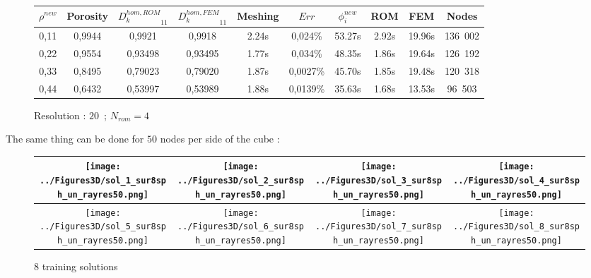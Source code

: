 {\begin{figure}[H]%
%
\begin{center}
\begin{tabular}{|c|c||c|c||c|c||c|c||c||c|}
\hline
\rowcolor{lightgray} $\rho^{new}$&Porosity&${D_k^{hom,ROM}}_{11}$&${D_k^{hom,FEM}}_{11}$&Meshing&$Err$&$\phi_i^{new}$&ROM&FEM&Nodes\\
\hline
0,11&0,9944&0,9921&0,9918&2.24s&0,024\%&53.27s&2.92s&19.96s&136\ 002\\
\hline
0,22&0,9554&0,93498&0,93495&1.77s&0,034\%&48.35s&1.86s&19.64s&126\ 192\\
\hline
0,33&0,8495&0,79023&0,79020&1.87s&0,0027\%&45.70s&1.85s&19.48s&120\ 318\\
\hline
0,44&0,6432&0,53997&0,53989&1.88s&0,0139\%&35.63s&1.68s&13.53s&96\ 503\\
\hline
\end{tabular}
\end{center}
\caption{Resolution : $20$\ ; $N_{rom}=4$}
%
\end{figure}

\ligneinter
The same thing can be done for $50$ nodes per side of the cube :

\begin{figure}[H]%
%
\begin{center}
\begin{tabular}{|c|c|c|c|}
\hline
\texttt{[image: ../Figures3D/sol\_1\_sur8sph\_un\_rayres50.png]}%
&%
\texttt{[image: ../Figures3D/sol\_2\_sur8sph\_un\_rayres50.png]}%
&%
\texttt{[image: ../Figures3D/sol\_3\_sur8sph\_un\_rayres50.png]}%
&%
\texttt{[image: ../Figures3D/sol\_4\_sur8sph\_un\_rayres50.png]}%
\\
\hline
\texttt{[image: ../Figures3D/sol\_5\_sur8sph\_un\_rayres50.png]}%
&%
\texttt{[image: ../Figures3D/sol\_6\_sur8sph\_un\_rayres50.png]}%
&%
\texttt{[image: ../Figures3D/sol\_7\_sur8sph\_un\_rayres50.png]}%
&%
\texttt{[image: ../Figures3D/sol\_8\_sur8sph\_un\_rayres50.png]}%
\\
\hline
\end{tabular}
\end{center}
\caption{$8$ training solutions}
%
\end{figure}

}
